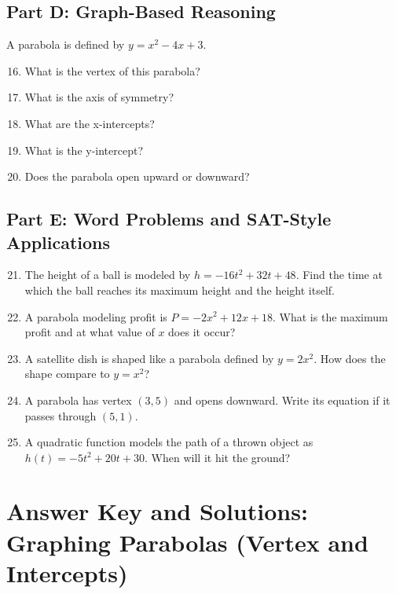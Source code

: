 \documentclass[14pt]{extarticle}
\begin{document}
\subsection*{Part D: Graph-Based Reasoning}
A parabola is defined by \(y = x^2 - 4x + 3\).
\begin{enumerate}
  \setcounter{enumi}{15}
  \item What is the vertex of this parabola?
  \item What is the axis of symmetry?
  \item What are the x-intercepts?
  \item What is the y-intercept?
  \item Does the parabola open upward or downward?
\end{enumerate}

\subsection*{Part E: Word Problems and SAT-Style Applications}
\begin{enumerate}
  \setcounter{enumi}{20}
  \item The height of a ball is modeled by \(h = -16t^2 + 32t + 48.\) Find the time at which the ball reaches its maximum height and the height itself.
  \item A parabola modeling profit is \(P = -2x^2 + 12x + 18.\) What is the maximum profit and at what value of \(x\) does it occur?
  \item A satellite dish is shaped like a parabola defined by \(y = 2x^2.\) How does the shape compare to \(y = x^2\)?
  \item A parabola has vertex \((3, 5)\) and opens downward. Write its equation if it passes through \((5, 1).\)
  \item A quadratic function models the path of a thrown object as \(h(t) = -5t^2 + 20t + 30.\) When will it hit the ground?
\end{enumerate}

\newpage


\section*{Answer Key and Solutions: Graphing Parabolas (Vertex and Intercepts)}
\end{document}
